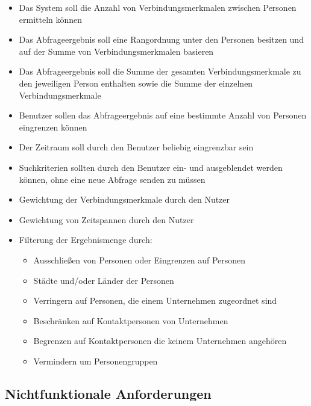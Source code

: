 \begin{itemize}
\item Das System soll die Anzahl von Verbindungsmerkmalen zwischen Personen ermitteln können

\item Das Abfrageergebnis soll eine Rangordnung unter den Personen besitzen und auf der Summe von Verbindungsmerkmalen basieren

\item Das Abfrageergebnis soll die Summe der gesamten Verbindungsmerkmale zu den jeweiligen Person enthalten sowie die Summe der einzelnen Verbindungsmerkmale

\item Benutzer sollen das Abfrageergebnis auf eine bestimmte Anzahl von Personen eingrenzen können

\item Der Zeitraum soll durch den Benutzer beliebig eingrenzbar sein

\item Suchkriterien sollten durch den Benutzer ein- und ausgeblendet werden können, ohne eine neue Abfrage senden zu müssen

\item Gewichtung der Verbindungsmerkmale durch den Nutzer

\item Gewichtung von Zeitspannen durch den Nutzer

\item Filterung der Ergebnismenge durch:	
	\begin{itemize}
	\item Ausschließen von Personen oder Eingrenzen auf Personen
	\item Städte und/oder Länder der Personen
	\item Verringern auf Personen, die einem Unternehmen zugeordnet sind 
	\item Beschränken auf Kontaktpersonen von Unternehmen
	\item Begrenzen auf Kontaktpersonen die keinem Unternehmen angehören
	\item Vermindern um Personengruppen
	\end{itemize}
\end{itemize}

\subsection{Nichtfunktionale Anforderungen}

